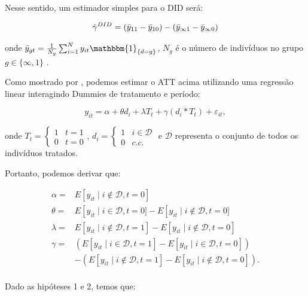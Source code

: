 \documentclass[portugues]{article}
\begin{document}
Nesse sentido, um estimador simples para o DID será:

\begin{equation}\label{eq:1_mean_did_est}
    \hat{\gamma}^{DID} = (\Bar{y}_{11} - \Bar{y}_{10}) - (\Bar{y}_{\infty1} - \Bar{y}_{\infty0})
\end{equation}

onde $\Bar{y}_{gt} = \frac{1}{N_g}\sum_{i=1}^{N} y_{it}  \mathbbm{1}_{\{d=g\}} $, $N_g$ é o número de indivíduos no grupo $g \in \{\infty, 1\}$ \citep{angrist2009mostly, callaway2021difference}.


Como mostrado por \cite{angrist2009mostly}, podemos estimar o ATT acima utilizando uma regressão linear interagindo Dummies de tratamento e período: 

\begin{equation}\label{eq:1_regdid}
    y_{it} = \alpha + \theta d_i + \lambda T_t + \gamma (d_i*T_t) +  \varepsilon_{it},
\end{equation}

onde $T_t = \begin{cases} 1 & t=1 \\ 0 & t=0 \end{cases}$, $d_i = \begin{cases} 1 & i \in \mathcal{D} \\ 0 & c.c. \end{cases}$ e $\mathcal{D}$ representa o conjunto de todos os indivíduos tratados.

Portanto, podemos derivar que:

\[
\begin{aligned}
\alpha=& E\left[y_{it} \mid i \not\in \mathcal{D}, t =0 \right] \\
\theta =&  E\left[y_{i t} \mid i \in \mathcal{D}, t=0]-E\left[y_{i t} \mid i \not \in \mathcal{D}, t=0 ]\right.\right. \\
\lambda = & E\left[y_{i t} \mid i \not \in \mathcal{D}, t=1 \right]-E\left[y_{i t} \mid i \not \in \mathcal{D}, t=0 \right] \\
\gamma=& \left(E\left[y_{it} \mid i \in \mathcal{D}, t=1 \right]-E\left[y_{it} \mid i \in \mathcal{D}, t=0\right]\right) \\
& -\left(E\left[y_{it} \mid i \not\in \mathcal{D}, t=1 \right]-E\left[y_{it} \mid i \not\in \mathcal{D}, t=0\right]\right). \\
&
\end{aligned}
\]

Dado as hipóteses 1 e 2, temos que:
\end{document}
